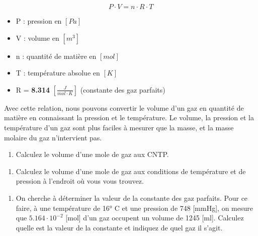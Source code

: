 \documentclass[
  11pt,
  a4paper,
  openany]{book}
\providecommand{\tightlist}{%
  \setlength{\itemsep}{0pt}\setlength{\parskip}{0pt}}
\begin{document}
\[
P \cdot V = n \cdot R \cdot T
\]

\begin{itemize}
\tightlist
\item
  P : pression en \(\left[Pa\right]\)
\item
  V : volume en \(\left[m^3\right]\)
\item
  n : quantité de matière en \(\left[mol\right]\)
\item
  T : température absolue en \(\left[K\right]\)
\item
  R = \textbf{8.314} \(\left[\frac{J}{mol \cdot K}\right]\) (constante des gaz parfaits)
\end{itemize}

Avec cette relation, nous pouvons convertir le volume d'un gaz en quantité de matière en connaissant la pression et le température. Le volume, la pression et la température d'un gaz sont plus faciles à mesurer que la masse, et la masse molaire du gaz n'intervient pas.

\begin{Exercise}

\begin{enumerate}
\def\labelenumi{\arabic{enumi}.}
\tightlist
\item
  Calculez le volume d'une mole de gaz aux CNTP.
\end{enumerate}


\begin{enumerate}
\def\labelenumi{\arabic{enumi}.}
\setcounter{enumi}{1}
\tightlist
\item
  Calculez le volume d'une mole de gaz aux conditions de température et de pression à l'endroit où vous vous trouvez.
\end{enumerate}


\begin{enumerate}
\def\labelenumi{\arabic{enumi}.}
\setcounter{enumi}{2}
\tightlist
\item
  On cherche à déterminer la valeur de la constante des gaz parfaits. Pour ce faire, à une température de 16° C et une pression de 748 {[}mmHg{]}, on mesure que \(5.164 \cdot 10^{-2}\) {[}mol{]} d'un gaz occupent un volume de 1245 {[}ml{]}. Calculez quelle est la valeur de la constante et indiquez de quel gaz il s'agit.
\end{enumerate}


\end{Exercise}
\end{document}
